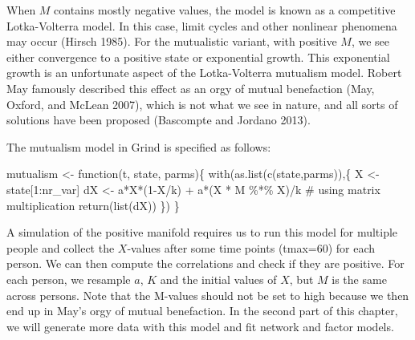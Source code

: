 \documentclass[
  a4paper,
  DIV=11,
  numbers=noendperiod,
  oneside]{scrreprt}
\newenvironment{Shaded}{\begin{snugshade}}{\end{snugshade}}
\newcommand{\CommentTok}[1]{\textcolor[rgb]{0.37,0.37,0.37}{#1}}
\newcommand{\ControlFlowTok}[1]{\textcolor[rgb]{0.00,0.23,0.31}{#1}}
\newcommand{\DecValTok}[1]{\textcolor[rgb]{0.68,0.00,0.00}{#1}}
\newcommand{\FunctionTok}[1]{\textcolor[rgb]{0.28,0.35,0.67}{#1}}
\newcommand{\NormalTok}[1]{\textcolor[rgb]{0.00,0.23,0.31}{#1}}
\newcommand{\OtherTok}[1]{\textcolor[rgb]{0.00,0.23,0.31}{#1}}
\newcommand{\SpecialCharTok}[1]{\textcolor[rgb]{0.37,0.37,0.37}{#1}}
\begin{document}
When \(M\) contains mostly negative values, the model is known as a
competitive Lotka-Volterra model. In this case, limit cycles and other
nonlinear phenomena may occur (Hirsch 1985). For the mutualistic
variant, with positive \(M\), we see either convergence to a positive
state or exponential growth. This exponential growth is an unfortunate
aspect of the Lotka-Volterra mutualism model. Robert May famously
described this effect as an orgy of mutual benefaction (May, Oxford, and
McLean 2007), which is not what we see in nature, and all sorts of
solutions have been proposed (Bascompte and Jordano 2013).

The mutualism model in Grind is specified as follows:

\begin{Shaded}
\begin{Highlighting}[]
\NormalTok{mutualism }\OtherTok{\textless{}{-}} \ControlFlowTok{function}\NormalTok{(t, state, parms)\{}
  \FunctionTok{with}\NormalTok{(}\FunctionTok{as.list}\NormalTok{(}\FunctionTok{c}\NormalTok{(state,parms)),\{}
\NormalTok{    X }\OtherTok{\textless{}{-}}\NormalTok{ state[}\DecValTok{1}\SpecialCharTok{:}\NormalTok{nr\_var]}
\NormalTok{    dX }\OtherTok{\textless{}{-}}\NormalTok{ a}\SpecialCharTok{*}\NormalTok{X}\SpecialCharTok{*}\NormalTok{(}\DecValTok{1}\SpecialCharTok{{-}}\NormalTok{X}\SpecialCharTok{/}\NormalTok{k) }\SpecialCharTok{+}\NormalTok{ a}\SpecialCharTok{*}\NormalTok{(X }\SpecialCharTok{*}\NormalTok{ M }\SpecialCharTok{\%*\%}\NormalTok{ X)}\SpecialCharTok{/}\NormalTok{k }\CommentTok{\# using matrix multiplication}
    \FunctionTok{return}\NormalTok{(}\FunctionTok{list}\NormalTok{(dX))}
\NormalTok{  \})}
\NormalTok{\}}
\end{Highlighting}
\end{Shaded}

A simulation of the positive manifold requires us to run this model for
multiple people and collect the \(X\)-values after some time points
(tmax=60) for each person. We can then compute the correlations and
check if they are positive. For each person, we resample \(a\), \(K\)
and the initial values of \(X\), but \(M\) is the same across persons.
Note that the M-values should not be set to high because we then end up
in May's orgy of mutual benefaction. In the second part of this chapter,
we will generate more data with this model and fit network and factor
models.
\end{document}
